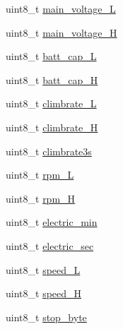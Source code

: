 \begin{DoxyCompactItemize}
\item 
uint8\+\_\+t \hyperlink{structHOTT__EAM__MSG__s_a064e616149e09e1cad2dfae253b918d1}{main\+\_\+voltage\+\_\+\+L}
\item 
uint8\+\_\+t \hyperlink{structHOTT__EAM__MSG__s_ad21a602c28cae3ed6415294007375bd1}{main\+\_\+voltage\+\_\+\+H}
\item 
uint8\+\_\+t \hyperlink{structHOTT__EAM__MSG__s_a1932bd0a2116e06b02ce441b1bbd052f}{batt\+\_\+cap\+\_\+\+L}
\item 
uint8\+\_\+t \hyperlink{structHOTT__EAM__MSG__s_a2960bd6ac7333c2a59bbcafe23c27df2}{batt\+\_\+cap\+\_\+\+H}
\item 
uint8\+\_\+t \hyperlink{structHOTT__EAM__MSG__s_ae4709627270d3e0d1eacc1495ee9efed}{climbrate\+\_\+\+L}
\item 
uint8\+\_\+t \hyperlink{structHOTT__EAM__MSG__s_a6be3573a93c587b7ec7f22aa344172d0}{climbrate\+\_\+\+H}
\item 
uint8\+\_\+t \hyperlink{structHOTT__EAM__MSG__s_a2639045dd8c7bb479f4e4d6206b25234}{climbrate3s}
\item 
uint8\+\_\+t \hyperlink{structHOTT__EAM__MSG__s_a441864d34481f84acceb3edafd3a28e2}{rpm\+\_\+\+L}
\item 
uint8\+\_\+t \hyperlink{structHOTT__EAM__MSG__s_acab7b0fa11c9e2bb0770ddc8b54633fa}{rpm\+\_\+\+H}
\item 
uint8\+\_\+t \hyperlink{structHOTT__EAM__MSG__s_aa13fd88bd9716975247650aaf66035d9}{electric\+\_\+min}
\item 
uint8\+\_\+t \hyperlink{structHOTT__EAM__MSG__s_ac62a82a5a9e83807d93e4d47c30b4feb}{electric\+\_\+sec}
\item 
uint8\+\_\+t \hyperlink{structHOTT__EAM__MSG__s_a2c0425748f44cf82eccb095a836dcb0f}{speed\+\_\+\+L}
\item 
uint8\+\_\+t \hyperlink{structHOTT__EAM__MSG__s_ae9d1df811dce25cbd356319467265487}{speed\+\_\+\+H}
\item 
uint8\+\_\+t \hyperlink{structHOTT__EAM__MSG__s_a2bf284ecf0a8381293138397b1b5e9b4}{stop\+\_\+byte}
\end{DoxyCompactItemize}


